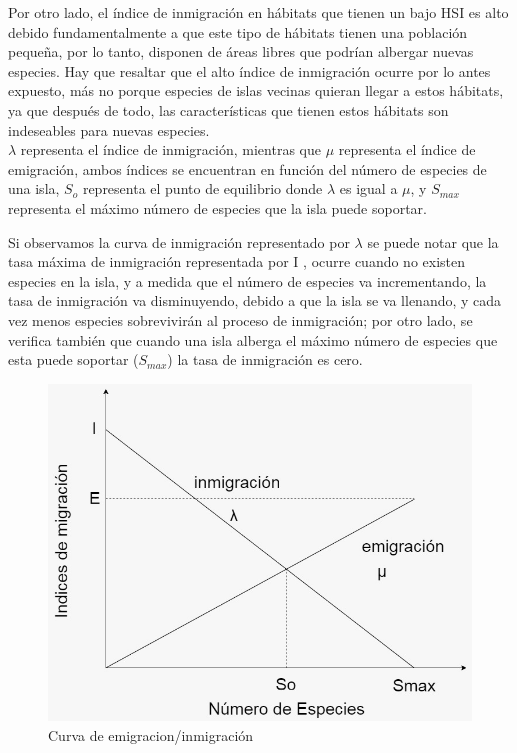 \documentclass{article}
\begin{document}
Por otro lado, el índice de inmigración en hábitats que tienen un bajo
HSI es alto debido fundamentalmente a que este tipo de hábitats tienen una
población pequeña, por lo tanto, disponen de áreas libres que podrían
albergar nuevas especies. Hay que resaltar que el alto índice de inmigración
ocurre por lo antes expuesto, más no porque especies de islas vecinas
quieran llegar a estos hábitats, ya que después de todo, las características
que tienen estos hábitats son indeseables para nuevas especies.\\

\vspace{3mm}
$\lambda$ representa el índice de inmigración, mientras que $\mu$
representa el índice de emigración, ambos índices se encuentran en función
del número de especies de una isla, $S_{o}$ representa el punto de equilibrio
donde $\lambda$ es igual a $\mu$, y $S_{max}$ representa el máximo número de especies que la
isla puede soportar. 

\vspace{3mm}
Si observamos la curva de inmigración representado por $\lambda$ se puede
notar que la tasa máxima de inmigración representada por I , ocurre cuando
no existen especies en la isla, y a medida que el número de especies va
incrementando, la tasa de inmigración va disminuyendo, debido a que la isla
se va llenando, y cada vez menos especies sobrevivirán al proceso de
inmigración; por otro lado, se verifica también que cuando una isla alberga el
máximo número de especies que esta puede soportar ($S_{max}$) la tasa de
inmigración es cero.

\vspace{10mm}
\begin{figure}[h]
	\centering
  \label {fig:BBO}
  \includegraphics[scale=0.3]{curvaInmEmig.png}
  \caption {Curva de emigracion/inmigración}
\end{figure}
\end{document}
